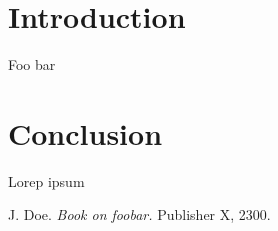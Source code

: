 \documentclass{ctuthesis}
\begin{document}
\maketitle
\chapter{Introduction}
Foo bar
\chapter{Conclusion}
Lorep ipsum \cite{doe}
\begin{thebibliography}{1}
	 J. Doe. \emph{Book on foobar.} Publisher X,
	2300.
\end{thebibliography}
\end{document}
